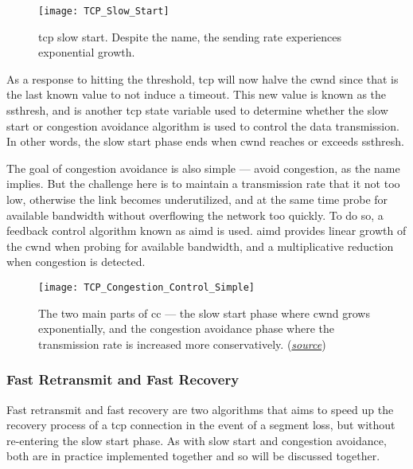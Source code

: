 \begin{figure}[H]
    \centering
    \texttt{[image: TCP\_Slow\_Start]}
    \captionsetup{width=0.4\textwidth}
    \caption{\gls{tcp} slow start. Despite the name, the sending rate experiences exponential growth. }
\end{figure}

As a response to hitting the threshold, \gls{tcp} will now halve the \gls{cwnd} since that is the last known value to not induce a timeout. This new value is known as the \gls{ssthresh}, and is another \gls{tcp} state variable used to determine whether the slow start or congestion avoidance algorithm is used to control the data transmission. In other words, the slow start phase ends when \gls{cwnd} reaches or exceeds \gls{ssthresh}.

The goal of congestion avoidance is also simple --- avoid congestion, as the name implies. But the challenge here is to maintain a transmission rate that it not too low, otherwise the link becomes underutilized, and at the same time probe for available bandwidth without overflowing the network too quickly. To do so, a feedback control algorithm known as \gls{aimd} is used. \gls{aimd} provides linear growth of the \gls{cwnd} when probing for available bandwidth, and a multiplicative reduction when congestion is detected.

\begin{figure}[H]
    \centering
    \texttt{[image: TCP\_Congestion\_Control\_Simple]}
    \captionsetup{width=0.7\textwidth}
    \caption{The two main parts of \gls{cc} --- the slow start phase where \gls{cwnd} grows exponentially, and the congestion avoidance phase where the transmission rate is increased more conservatively. (\href{https://hpbn.co/building-blocks-of-tcp/}{\textit{source}})}
\end{figure}






\subsubsection{Fast Retransmit and Fast Recovery}

Fast retransmit and fast recovery are two algorithms that aims to speed up the recovery process of a \gls{tcp} connection in the event of a segment loss, but without re-entering the slow start phase. As with slow start and congestion avoidance, both are in practice implemented together and so will be discussed together.

